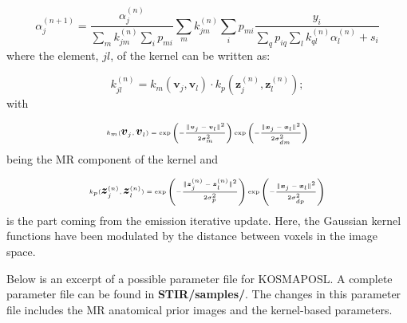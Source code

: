 \documentclass{article}
\begin{document}
  \[
  \alpha^{(n+1)}_j =  \frac{ \alpha^{(n)}_j }{\sum_{m} k^{(n)}_{jm} \sum_i p_{mi}} \sum_{m}k^{(n)}_{jm}\sum_i p_{mi}\frac{ y_i }{\sum_{q} p_{iq} \sum_l k^{(n)}_{ql}\alpha^{(n)}_l  + s_i}
  \]
  \noindent
  where the  element, $ jl $, of the kernel can be written as:

  \[
    k^{(n)}_{jl} = k_m(\boldsymbol{v}_j,\boldsymbol{v}_l) \cdot k_p(\boldsymbol{z}^{(n)}_j,\boldsymbol{z}^{(n)}_l);
  \]
  \noindent
  with

  \[
   k_m(\boldsymbol{v}_j,\boldsymbol{v}_l) = \exp \left(\tiny - \frac{\|  \boldsymbol{v}_j-\boldsymbol{v}_l \|^2}{2 \sigma_m^2} \right) \exp \left(- \frac{\tiny \|  \boldsymbol{x}_j-\boldsymbol{x}_l \|^2}{ \tiny 2 \sigma_{dm}^2} \right)
  \]
  \noindent
  being the MR component of the kernel and

  \[
   k_p(\boldsymbol{z}^{(n)}_j,\boldsymbol{z}^{(n)}_l) = \exp \left(\tiny - \frac{\|  \boldsymbol{z}^{(n)}_j-\boldsymbol{z}^{(n)}_l \|^2}{2 \sigma_p^2} \right) \exp \left(\tiny - \frac{\|  \boldsymbol{x}_j-\boldsymbol{x}_l \|^2}{ \tiny{2 \sigma_{dp}^2}} \right)
  \]
  \noindent
  is the part coming from the emission iterative update. Here, the Gaussian kernel functions have been modulated by the distance between voxels in the image space.

Below is an excerpt of a possible parameter file for KOSMAPOSL. A complete parameter file
can be found in \textbf{STIR/samples/}. The changes in this parameter file includes the MR anatomical prior images and the kernel-based parameters. 
\end{document}

